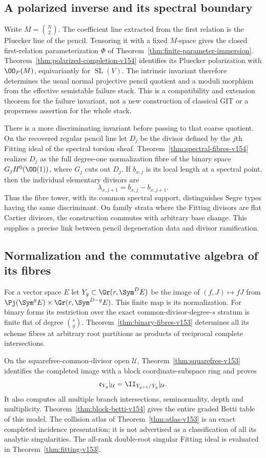 \subsection{A polarized inverse and its spectral boundary}
Write $M=\binom N2$. The coefficient line extracted from the first
relation is the Pluecker line of the pencil. Tensoring it with a
fixed $M$-space gives the closed first-relation parameterization
$\Phi$ of Theorem~\ref{thm:finite-parameter-immersion}.
Theorem~\ref{thm:polarized-completion-v154} identifies its
Pluecker polarization with $\OO_P(M)$, equivariantly for
$\operatorname{SL}(V)$. The intrinsic invariant therefore determines
the usual normal projective pencil quotient and a moduli morphism
from the effective semistable failure stack. This is a compatibility
and extension theorem for the failure invariant, not a new
construction of classical GIT or a properness assertion for the
whole stack.

There is a more discriminating invariant before passing to that
coarse quotient. On the recovered regular pencil line let $D_j$
be the divisor defined by the $j$th Fitting ideal of the spectral
torsion sheaf. Theorem~\ref{thm:spectral-fibres-v154} realizes $D_j$
as the full degree-one normalization fibre of the binary space
$G_jH^0(\OO(1))$, where $G_j$ cuts out $D_j$. If $b_{x,j}$ is its
local length at a spectral point, then the individual elementary
divisors are
\[
                    \lambda_{x,j+1}=b_{x,j}-b_{x,j+1}.
\]
Thus the fibre tower, with its common spectral support, distinguishes
Segre types having the same discriminant. On family strata where
the Fitting divisors are flat Cartier divisors, the construction
commutes with arbitrary base change. This supplies a precise link
between pencil degeneration data and divisor ramification.

\subsection{Normalization and the commutative algebra of its fibres}
For a vector space $E$ let $Y_g\subset\Gr(r,\Sym^D E)$ be the
image of $(f,J)\mapsto fJ$ from
$\Pj(\Sym^g E)\times\Gr(r,\Sym^{D-g}E)$. This finite map is its
normalization. For binary forms its restriction over the exact
common-divisor-degree-$s$ stratum is finite flat of degree
$\binom{s}{g}$. Theorem~\ref{thm:binary-fibres-v153} determines
all its scheme fibres at arbitrary root partitions as products
of reciprocal complete intersections.

On the squarefree-common-divisor open $\mathcal U$,
Theorem~\ref{thm:squarefree-v153} identifies the completed image
with a block coordinate-subspace ring and proves
\[
            \mathfrak c_{Y_g}|_{\mathcal U}
                  =\II_{Y_{g+1}/Y_g}|_{\mathcal U}.
\]
It also computes all multiple branch intersections, seminormality,
depth and multiplicity. Theorem~\ref{thm:block-betti-v154} gives
the entire graded Betti table of this model. The collision atlas
of Theorem~\ref{thm:atlas-v153} is an exact completed incidence
presentation; it is not advertised as a classification of all its
analytic singularities. The all-rank double-root singular Fitting
ideal is evaluated in Theorem~\ref{thm:fitting-v153}.

